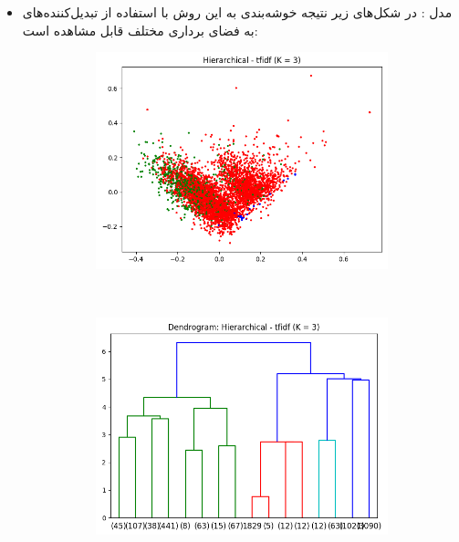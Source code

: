 \documentclass[11pt]{article}
\begin{document}
\begin{itemize}
\item
مدل  : در شکل‌های زیر نتیجه خوشه‌بندی به این روش با استفاده از تبدیل‌کننده‌های به فضای برداری مختلف قابل مشاهده است: \\
\begin{figure}[H]
\begin{center}
\begin{subfigure}{0.4\textwidth}
\includegraphics[width=\textwidth]{pics/hier_tfidf.png}
\caption{}
\end{subfigure}
~
\begin{subfigure}{0.4\textwidth}
\includegraphics[width=\textwidth]{pics/dendro_tfidf.png}
\caption{}
\end{subfigure}


\end{center}
\end{figure}
\end{itemize}
\end{document}
